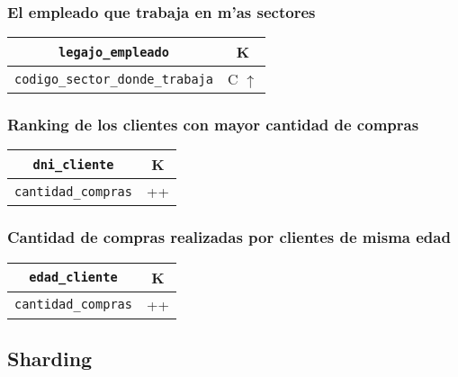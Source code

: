 \subsubsection{El empleado que trabaja en m'as sectores}

\begin{center}
\begin{tabular}{|c|c|}
\hline
\texttt{legajo\_empleado} & K\\
\hline
\texttt{codigo\_sector\_donde\_trabaja} & C $\uparrow$\\
\hline
\end{tabular}
\end{center}

\subsubsection{Ranking de los clientes con mayor cantidad de compras}

\begin{center}
\begin{tabular}{|c|c|}
\hline
\texttt{dni\_cliente} & K\\
\hline
\texttt{cantidad\_compras} & ++\\
\hline
\end{tabular}
\end{center}

\subsubsection{Cantidad de compras realizadas por clientes de misma edad}

\begin{center}
\begin{tabular}{|c|c|}
\hline
\texttt{edad\_cliente} & K\\
\hline
\texttt{cantidad\_compras} & ++\\
\hline
\end{tabular}
\end{center}

\subsection{Sharding}
